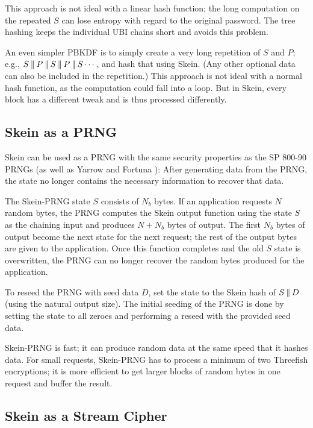 \documentclass[11pt,twoside]{article}
\newcommand{\concat}{\mathbin{|\hspace{-1pt}|}}
\begin{document}
This approach is not ideal with a linear hash function; the long computation on the repeated $S$ can lose entropy with regard to the original password. The tree hashing keeps the individual UBI chains short and avoids this problem.

An even simpler PBKDF is to simply create a very long repetition of $S$ and $P$; e.g., $S \concat P \concat S \concat P \concat S \cdots$, and hash that using Skein. (Any other optional data can also be included in the repetition.) This approach is not ideal with a normal hash function, as the computation could fall into a loop.  But in Skein, every block has a different tweak and is thus processed differently.

\subsection{Skein as a PRNG}

Skein can be used as a PRNG with the same security properties as the SP 800-90 PRNGs \cite{RNG} (as well as Yarrow \cite{KSF99} and Fortuna \cite{FS03}): After generating data from the PRNG, the state no longer contains the necessary information to recover that data.

The Skein-PRNG state $S$ consists of $N_b$ bytes.  If an application requests $N$ random bytes, the PRNG computes the Skein output function using the state $S$ as the chaining input and produces $N + N_b$ bytes of output. The first $N_b$ bytes of output become the next state for the next request; the rest of the output bytes are given to the application. Once this function completes and the old $S$ state is overwritten, the PRNG can no longer recover the random bytes produced for the application.

To reseed the PRNG with seed data $D$, set the state to the Skein hash of $S \concat D$ (using the natural output size).  The initial seeding of the PRNG is done by setting the state to all zeroes and performing a reseed with the provided seed data.

Skein-PRNG is fast; it can produce random data at the same speed that it hashes data. For small requests, Skein-PRNG has to process a minimum of two Threefish encryptions; it is more efficient to get larger blocks of random bytes in one request and buffer the result.

\subsection{Skein as a Stream Cipher}
\end{document}
